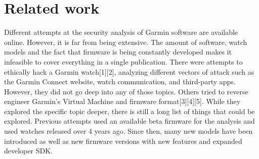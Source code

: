 \section{Related work}

Different attempts at the security analysis of Garmin software are available online.
However, it is far from being extensive.
The amount of software, watch models and the fact that firmware is being constantly developed makes it infeasible to cover everything in a single publication.
There were attempts to ethically hack a Garmin watch[1][2], analyzing different vectors of attack such as the Garmin Connect website, watch communication, and third-party apps.
However, they did not go deep into any of those topics.
Others tried to reverse engineer Garmin’s Virtual Machine and firmware format[3][4][5].
While they explored the specific topic deeper, there is still a long list of things that could be explored.
Previous attempts used an available beta firmware for the analysis and used watches released over 4 years ago.
Since then, many new models have been introduced as well as new firmware versions with new features and expanded developer SDK.
